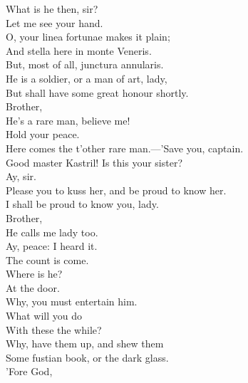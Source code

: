\documentclass[a4paper,oneside]{memoir}
\begin{document}
\begin{drama*}
\pliantspeaks What is he then, sir?\\
\subtlespeaks {} Let me see your hand.\\
O, your linea fortunae makes it plain;\\
And stella here in monte Veneris.\\
But, most of all, junctura annularis.\\
He is a soldier, or a man of art, lady,\\
But shall have some great honour shortly.\\
\pliantspeaks {} Brother,\\
He's a rare man, believe me!\\
\kastrilspeaks {} Hold your peace.\\
Here comes the t'other rare man.---'Save you, captain.\\
\facespeaks Good master Kastril! Is this your sister?\\
\kastrilspeaks {} Ay, sir.\\
Please you to kuss her, and be proud to know her.\\
\facespeaks I shall be proud to know you, lady.\\
\pliantspeaks {} Brother,\\
He calls me lady too.\\
\kastrilspeaks {} Ay, peace: I heard it.\\
\facespeaks The count is come.\\
\subtlespeaks {} Where is he?\\
\facespeaks {} At the door.\\
\subtlespeaks Why, you must entertain him.\\
\facespeaks {} What will you do\\
With these the while?\\
\subtlespeaks {} Why, have them up, and shew them\\
Some fustian book, or the dark glass.\\
\facespeaks {} 'Fore God,\\

\end{drama*}
\end{document}
